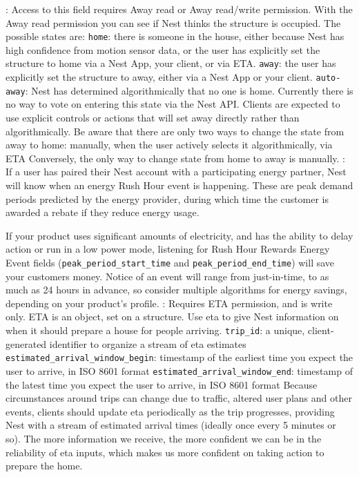 \documentclass{myproc}
\begin{document}
\w {}:
Access to this field requires Away read or Away read/write permission.
With the Away read permission you can see if Nest thinks the structure is occupied. The possible states are:
  \bit
  \w \textcolor{red2}{\texttt{home}}: there is someone in the house, either because Nest has high confidence from motion sensor data, or the user has explicitly set the structure to home via a Nest App, your client, or via ETA.
  \w  \textcolor{red2}{\texttt{away}}: the user has explicitly set the structure to away, either via a Nest App or your client.
  \w \textcolor{red2}{\texttt{auto-away}}: Nest has determined algorithmically
  that no one is home. Currently there is no way to vote on entering this
  state via the Nest API. Clients are expected to use explicit controls or
  actions that will set away directly rather than algorithmically.
  \eit
Be aware that there are only two ways to change the state from away to home:
   \bit
   \w manually, when the user actively selects it
   \w algorithmically, via ETA
   \eit
Conversely, the only way to change state from home to away is manually.
\w {}:
  If a user has paired their Nest account with a participating energy partner, Nest will know when an energy Rush Hour event is happening. These are peak demand periods predicted by the energy provider, during which time the customer is awarded a rebate if they reduce energy usage.

If your product uses significant amounts of electricity, and has the ability to delay action or run in a low power mode, listening for Rush Hour Rewards Energy Event fields (\textcolor{red2}{\texttt{peak\_period\_start\_time}} and \textcolor{red2}{\texttt{peak\_period\_end\_time}}) will save your customers money. Notice of an event will range from just-in-time, to as much as 24 hours in advance, so consider multiple algorithms for energy savings, depending on your product's profile.
\w {}: Requires ETA permission, and is write only. ETA is an object, set on a structure. Use eta to give Nest information on when it should prepare a house for people arriving.
  \bit
  \w \textcolor{red2}{\texttt{trip\_id}}: a unique, client-generated identifier to organize a stream of eta estimates
  \w \textcolor{red2}{\texttt{estimated\_arrival\_window\_begin}}: timestamp of the earliest time you expect the user to arrive, in ISO 8601 format
  \w \textcolor{red2}{\texttt{estimated\_arrival\_window\_end}}: timestamp of
  the latest time you expect the user to arrive, in ISO 8601 format
  \eit
Because circumstances around trips can change due to traffic, altered user plans and other events, clients should update eta periodically as the trip progresses, providing Nest with a stream of estimated arrival times (ideally once every 5 minutes or so). The more information we receive, the more confident we can be in the reliability of eta inputs, which makes us more confident on taking action to prepare the home.
\eit
\end{document}
